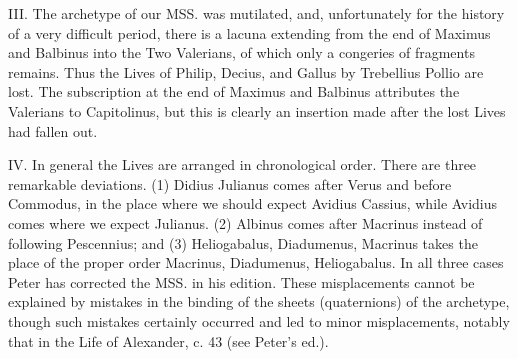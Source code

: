 III. The archetype of our MSS. was mutilated, and, unfortunately for the history of a very difficult period, there is a lacuna extending from the end of Maximus and Balbinus into the Two Valerians, of which only a congeries of fragments remains. Thus the Lives of Philip, Decius, and Gallus by Trebellius Pollio are lost. The subscription at the end of Maximus and Balbinus attributes the Valerians to Capitolinus, but this is clearly an insertion made after the lost Lives had fallen out.

IV. In general the Lives are arranged in chronological order. There are three remarkable deviations. (1) Didius Julianus comes after Verus and before Commodus, in the place where we should expect Avidius Cassius, while Avidius comes where we expect Julianus. (2) Albinus comes after Macrinus instead of following Pescennius; and (3) Heliogabalus, Diadumenus, Macrinus takes the place of the proper order Macrinus, Diadumenus, Heliogabalus. In all three cases Peter has corrected the MSS. in his edition. These misplacements cannot be explained by mistakes in the binding of the sheets (quaternions) of the archetype, though such mistakes certainly occurred and led to minor misplacements, notably that in the Life of Alexander, c. 43 (see Peter\texthebrew{}’s ed.).

